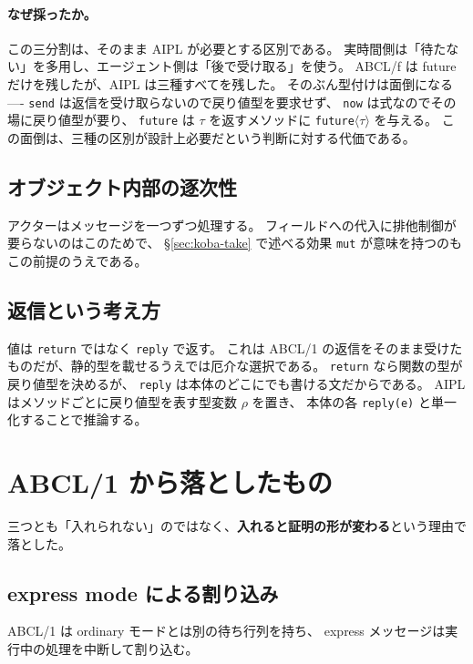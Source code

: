 \documentclass[11pt,a4paper]{ltjsarticle}
\theoremstyle{definition}
\theoremstyle{remark}
\begin{document}
\paragraph{なぜ採ったか。}
この三分割は、そのまま AIPL が必要とする区別である。
実時間側は「待たない」を多用し、エージェント側は「後で受け取る」を使う。
ABCL/f は future だけを残したが、AIPL は三種すべてを残した。
そのぶん型付けは面倒になる ---- \texttt{send} は返信を受け取らないので戻り値型を要求せず、
\texttt{now} は式なのでその場に戻り値型が要り、
\texttt{future} は $\tau$ を返すメソッドに \texttt{future}$\langle\tau\rangle$ を与える。
この面倒は、三種の区別が設計上必要だという判断に対する代価である。

\subsection{オブジェクト内部の逐次性}

アクターはメッセージを一つずつ処理する。
フィールドへの代入に排他制御が要らないのはこのためで、
\S\ref{sec:koba-take} で述べる効果 \texttt{mut} が意味を持つのもこの前提のうえである。

\subsection{返信という考え方}

値は \texttt{return} ではなく \texttt{reply} で返す。
これは ABCL/1 の返信をそのまま受けたものだが、静的型を載せるうえでは厄介な選択である。
\texttt{return} なら関数の型が戻り値型を決めるが、
\texttt{reply} は本体のどこにでも書ける文だからである。
AIPL はメソッドごとに戻り値型を表す型変数 $\rho$ を置き、
本体の各 \texttt{reply(e)} と単一化することで推論する。

\section{ABCL/1 から落としたもの}
\label{sec:abcl-drop}

三つとも「入れられない」のではなく、\textbf{入れると証明の形が変わる}という理由で落とした。

\subsection{express mode による割り込み}

ABCL/1 は ordinary モードとは別の待ち行列を持ち、
express メッセージは実行中の処理を中断して割り込む。
\end{document}
